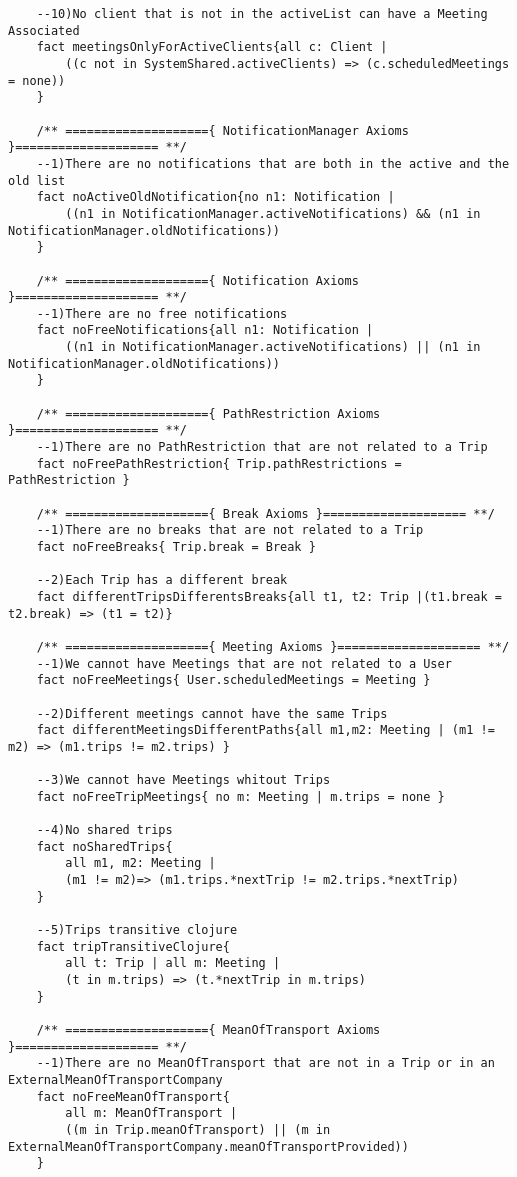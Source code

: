 \documentclass[a4paper,leqno]{book}
\begin{document}
\begin{lstlisting}
	--10)No client that is not in the activeList can have a Meeting Associated
	fact meetingsOnlyForActiveClients{all c: Client |
		((c not in SystemShared.activeClients) => (c.scheduledMeetings = none))
	}
	
	/** ===================={ NotificationManager Axioms }==================== **/
	--1)There are no notifications that are both in the active and the old list
	fact noActiveOldNotification{no n1: Notification |
		((n1 in NotificationManager.activeNotifications) && (n1 in NotificationManager.oldNotifications))
	}
	
	/** ===================={ Notification Axioms }==================== **/
	--1)There are no free notifications
	fact noFreeNotifications{all n1: Notification |
		((n1 in NotificationManager.activeNotifications) || (n1 in NotificationManager.oldNotifications))
	}
	
	/** ===================={ PathRestriction Axioms }==================== **/
	--1)There are no PathRestriction that are not related to a Trip
	fact noFreePathRestriction{ Trip.pathRestrictions = PathRestriction }
	
	/** ===================={ Break Axioms }==================== **/
	--1)There are no breaks that are not related to a Trip
	fact noFreeBreaks{ Trip.break = Break }
	
	--2)Each Trip has a different break
	fact differentTripsDifferentsBreaks{all t1, t2: Trip |(t1.break = t2.break) => (t1 = t2)}
	
	/** ===================={ Meeting Axioms }==================== **/
	--1)We cannot have Meetings that are not related to a User
	fact noFreeMeetings{ User.scheduledMeetings = Meeting }
	
	--2)Different meetings cannot have the same Trips
	fact differentMeetingsDifferentPaths{all m1,m2: Meeting | (m1 != m2) => (m1.trips != m2.trips) }
	
	--3)We cannot have Meetings whitout Trips
	fact noFreeTripMeetings{ no m: Meeting | m.trips = none }
	
	--4)No shared trips
	fact noSharedTrips{
		all m1, m2: Meeting |
		(m1 != m2)=> (m1.trips.*nextTrip != m2.trips.*nextTrip)
	}
	
	--5)Trips transitive clojure
	fact tripTransitiveClojure{
		all t: Trip | all m: Meeting |
		(t in m.trips) => (t.*nextTrip in m.trips)
	}
	
	/** ===================={ MeanOfTransport Axioms }==================== **/
	--1)There are no MeanOfTransport that are not in a Trip or in an ExternalMeanOfTransportCompany
	fact noFreeMeanOfTransport{
		all m: MeanOfTransport |
		((m in Trip.meanOfTransport) || (m in ExternalMeanOfTransportCompany.meanOfTransportProvided))
	}
	

\end{lstlisting}
\end{document}
